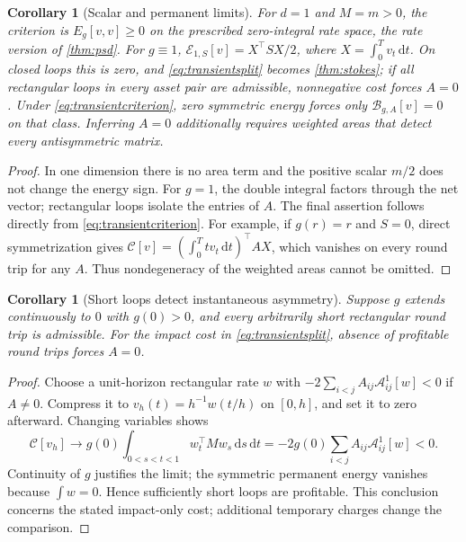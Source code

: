 \documentclass[11pt]{article}
\numberwithin{equation}{section}
\newtheorem{corollary}[theorem]{Corollary}
\theoremstyle{definition}
\theoremstyle{remark}
\theoremstyle{definition}
\newcommand{\dd}{\,\mathrm d}
\begin{document}
\begin{corollary}[Scalar and permanent limits]\label{cor:transientlimits}
For $d=1$ and $M=m>0$, the criterion is $E_g[v,v]\ge0$ on the prescribed
zero-integral rate space, the rate version of \cref{thm:psd}.
For $g\equiv1$, $\mathcal E_{1,S}[v]=X^\top SX/2$, where
$X=\int_0^Tv_t\dd t$. On closed loops this is zero, and
\eqref{eq:transientsplit} becomes \cref{thm:stokes}; if all rectangular
loops in every asset pair are admissible, nonnegative cost forces $A=0$.
Under \eqref{eq:transientcriterion}, zero symmetric energy forces only
$\mathcal B_{g,A}[v]=0$ on that class. Inferring $A=0$ additionally
requires weighted areas that detect every antisymmetric matrix.
\end{corollary}
\begin{proof}
In one dimension there is no area term and the positive scalar $m/2$
does not change the energy sign. For $g=1$, the double integral factors
through the net vector; rectangular loops isolate the entries of $A$.
The final assertion follows directly from \eqref{eq:transientcriterion}.
For example, if $g(r)=r$ and $S=0$, direct symmetrization gives
$\mathcal C[v]=(\int_0^Tt v_t\dd t)^\top A X$, which vanishes on every
round trip for any $A$. Thus nondegeneracy of the weighted areas cannot
be omitted.
\end{proof}

\begin{corollary}[Short loops detect instantaneous asymmetry]\label{cor:shortloops}
Suppose $g$ extends continuously to $0$ with $g(0)>0$, and every
arbitrarily short rectangular round trip is admissible. For the impact
cost in \eqref{eq:transientsplit}, absence of profitable round trips
forces $A=0$.
\end{corollary}
\begin{proof}
Choose a unit-horizon rectangular rate $w$ with
$-2\sum_{i<j}A_{ij}\mathcal A^1_{ij}[w]<0$ if $A\ne0$.
Compress it to $v_h(t)=h^{-1}w(t/h)$ on $[0,h]$, and set it to zero
afterward. Changing variables shows
\[
 \mathcal C[v_h]\longrightarrow
 g(0)\int_{0<s<t<1}w_t^\top Mw_s\dd s\dd t
 =-2g(0)\sum_{i<j}A_{ij}\mathcal A^1_{ij}[w]<0 .
\]
Continuity of $g$ justifies the limit; the symmetric permanent energy
vanishes because $\int w=0$. Hence sufficiently short loops are
profitable. This conclusion concerns the stated impact-only cost;
additional temporary charges change the comparison.
\end{proof}
\end{document}
